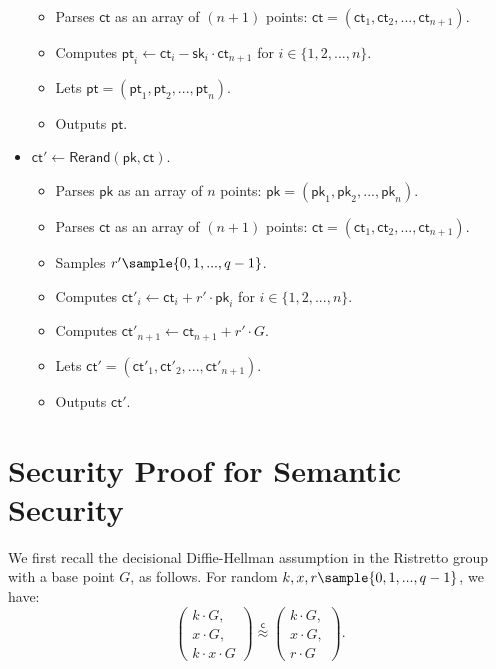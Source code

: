 \documentclass{article}
\begin{document}
\begin{itemize}
\begin{itemize}
        \item Parses $\mathsf{ct}$ as an array of $(n+1)$ points: $\mathsf{ct}=(\mathsf{ct}_1, \mathsf{ct}_2, ..., \mathsf{ct}_{n+1})$.
        
        \item Computes $\mathsf{pt}_i\leftarrow\mathsf{ct}_i-\mathsf{sk}_{i}\cdot\mathsf{ct}_{n+1}$  for $i\in\{1,2,...,n\}$.
        
        \item Lets $\mathsf{pt}=(\mathsf{pt}_1, \mathsf{pt}_2, ..., \mathsf{pt}_{n})$.
        
        \item Outputs $\mathsf{pt}$. 
    \end{itemize}
    
    \item $\mathsf{ct}'\leftarrow\mathsf{Rerand}\left(\mathsf{pk},\mathsf{ct}\right)$. 
    \begin{itemize}
        \item Parses $\mathsf{pk}$ as an array of $n$ points: $\mathsf{pk}=(\mathsf{pk}_1, \mathsf{pk}_2, ..., \mathsf{pk}_n)$.
    
        \item Parses $\mathsf{ct}$ as an array of $(n+1)$ points: $\mathsf{ct}=(\mathsf{ct}_1, \mathsf{ct}_2, ..., \mathsf{ct}_{n+1})$.
        
        \item Samples $r'\sample\{0,1,...,q-1\}$.
        
        \item Computes $\mathsf{ct}'_i\leftarrow\mathsf{ct}_i+ r'\cdot \mathsf{pk}_i$ for $i\in\{1,2,...,n\}$. 
        
        \item Computes $\mathsf{ct}'_{n+1}\leftarrow\mathsf{ct}_{n+1}+r'\cdot G$. 
        
        \item Lets $\mathsf{ct}'=(\mathsf{ct}'_1, \mathsf{ct}'_2, ..., \mathsf{ct}'_{n+1})$.
        
        \item Outputs $\mathsf{ct}'$.
    \end{itemize}
\end{itemize}

\section{Security Proof for Semantic Security}
We first recall the decisional Diffie-Hellman assumption in the Ristretto group with a base point $G$, as follows. For random $k, x, r\sample\{0,1,...,q-1\}$, we have:
\[
\left(\begin{array}{r}
k\cdot G,\\
x\cdot G,\\
k\cdot x\cdot G
\end{array}\right)\stackrel{\mathsf{c}}{\approx}\left(\begin{array}{l}
k\cdot G,\\
x\cdot G,\\
r\cdot G
\end{array}\right).
\]
\end{document}
